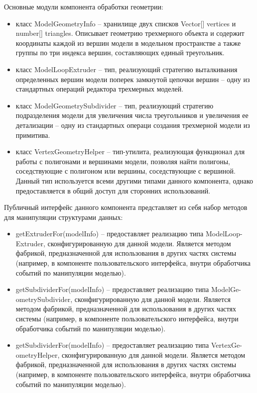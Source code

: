 Основные модули компонента обработки геометрии:
\begin{itemize}
\item класс ModelGeometryInfo -- хранилище двух списков Vector[] vertices и number[] triangles. Описывает геометрию трехмерного объекта и содержит координаты каждой из вершин модели в
модельном пространстве а также группы по три индекса вершин, составляющих единый треугольник.
\item класс ModelLoopExtruder -- тип, реализующий стратегию выталкивания определенных вершин модели поперек замкнутой цепочки вершин -- одну из стандартных операций редактора трехмерных моделей.
\item класс ModelGeometrySubdivider -- тип, реализующий стратегию подразделения модели для увеличения числа треугольников и увеличения ее детализации -- одну из стандартных операци создания
трехмерной модели из примитива.
\item класс VertexGeometryHelper -- тип-утилита, реализующая функционал для работы с полигонами и вершинами модели, позволяя найти полигоны, соседствующие с полигоном или вершины, соседствующие
с вершиной. Данный тип используется всеми другими типами данного компонента, однако предоставляется в общий доступ для сторонних использований.
\end{itemize}

Публичный интерфейс данного компонента представляет из себя набор методов для манипуляции структурами данных:
\begin{itemize}
\item getExtruderFor(modelInfo) -- предоставляет реализацию типа ModelLoop-Extruder, сконфигурированную для данной модели. Является методом фабрикой, предназначенной для использования в других
частях системы (например, в компоненте пользовательского интерфейса, внутри обработчика событий по манипуляции моделью).
\item getSubdividerFor(modelInfo) -- предоставляет реализацию типа ModelGe-ometrySubdivider, сконфигурированную для данной модели. Является методом фабрикой, предназначенной для использования в других
частях системы (например, в компоненте пользовательского интерфейса, внутри обработчика событий по манипуляции моделью).
\item getSubdividerFor(modelInfo) -- предоставляет реализацию типа VertexGe-ometryHelper, сконфигурированную для данной модели. Является методом фабрикой, предназначенной для использования в других
частях системы (например, в компоненте пользовательского интерфейса, внутри обработчика событий по манипуляции моделью).
\end{itemize}


